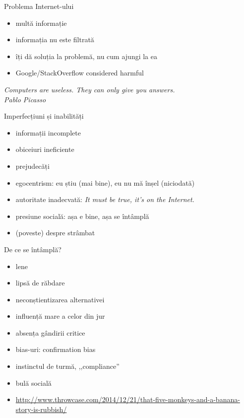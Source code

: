 \documentclass{beamer}
\begin{document}
\begin{frame}{Problema Internet-ului}
  \begin{itemize}
    \pause \item multă informație
    \item informația nu este filtrată
    \pause \item îți dă soluția la problemă, nu cum ajungi la ea
    \pause \item Google/StackOverflow considered harmful
  \end{itemize}
  \pause
  \vspace{1cm}
  \centering
  \textit{Computers are useless. They can only give you answers.}\\
  \vspace{3mm}
  \hfill \textit{Pablo Picasso}
\end{frame}

\begin{frame}{Imperfecțiuni și inabilități}
  \begin{itemize}
    \pause \item informații incomplete
    \pause \item obiceiuri ineficiente
    \pause \item prejudecăți
    \pause \item egocentrism: eu știu (mai bine), eu nu mă înșel (niciodată)
    \pause \item autoritate inadecvată: \textit{It must be true, it's on the Internet.}
    \pause \item presiune socială: așa e bine, așa se întâmplă
    \pause \item (poveste) despre strâmbat
  \end{itemize}
\end{frame}

\begin{frame}{De ce se întâmplă?}
  \begin{itemize}
    \pause \item lene
    \pause \item lipsă de răbdare
    \pause \item neconștientizarea alternativei
    \pause \item influență mare a celor din jur
    \pause \item absența gândirii critice
    \pause \item bias-uri: confirmation bias
    \pause \item instinctul de turmă, ,,compliance''
    \pause \item bulă socială
    \pause \item \url{http://www.throwcase.com/2014/12/21/that-five-monkeys-and-a-banana-story-is-rubbish/}
  \end{itemize}
\end{frame}
\end{document}
